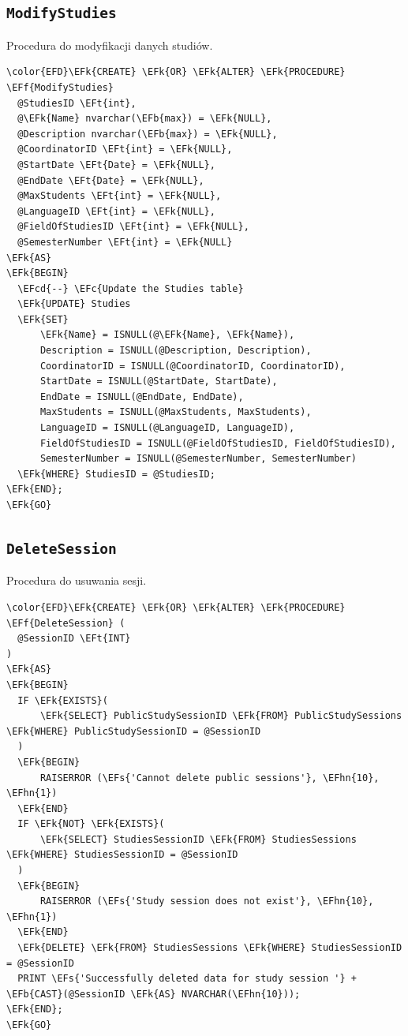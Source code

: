 \documentclass[11pt]{article}
\newcommand{\EFc}[1]{\textcolor{EFc}{\textit{#1}}} %
\newcommand{\EFcd}[1]{\textcolor{EFcd}{\textit{#1}}} %
\newcommand{\EFs}[1]{\textcolor{EFs}{#1}} %
\newcommand{\EFk}[1]{\textcolor{EFk}{\textbf{#1}}} %
\newcommand{\EFb}[1]{\textcolor{EFb}{\textbf{#1}}} %
\newcommand{\EFf}[1]{\textcolor{EFf}{#1}} %
\newcommand{\EFt}[1]{\textcolor{EFt}{\textbf{#1}}} %
\newcommand{\EFhn}[1]{\textcolor{EFhn}{#1}} %
\begin{document}
\subsection{\texttt{ModifyStudies}}
\label{sec:org184f578}
Procedura do modyfikacji danych studiów.
\begin{Code}
\begin{Verbatim}
\color{EFD}\EFk{CREATE} \EFk{OR} \EFk{ALTER} \EFk{PROCEDURE} \EFf{ModifyStudies}
  @StudiesID \EFt{int},
  @\EFk{Name} nvarchar(\EFb{max}) = \EFk{NULL},
  @Description nvarchar(\EFb{max}) = \EFk{NULL},
  @CoordinatorID \EFt{int} = \EFk{NULL},
  @StartDate \EFt{Date} = \EFk{NULL},
  @EndDate \EFt{Date} = \EFk{NULL},
  @MaxStudents \EFt{int} = \EFk{NULL},
  @LanguageID \EFt{int} = \EFk{NULL},
  @FieldOfStudiesID \EFt{int} = \EFk{NULL},
  @SemesterNumber \EFt{int} = \EFk{NULL}
\EFk{AS}
\EFk{BEGIN}
  \EFcd{--} \EFc{Update the Studies table}
  \EFk{UPDATE} Studies
  \EFk{SET}
      \EFk{Name} = ISNULL(@\EFk{Name}, \EFk{Name}),
      Description = ISNULL(@Description, Description),
      CoordinatorID = ISNULL(@CoordinatorID, CoordinatorID),
      StartDate = ISNULL(@StartDate, StartDate),
      EndDate = ISNULL(@EndDate, EndDate),
      MaxStudents = ISNULL(@MaxStudents, MaxStudents),
      LanguageID = ISNULL(@LanguageID, LanguageID),
      FieldOfStudiesID = ISNULL(@FieldOfStudiesID, FieldOfStudiesID),
      SemesterNumber = ISNULL(@SemesterNumber, SemesterNumber)
  \EFk{WHERE} StudiesID = @StudiesID;
\EFk{END};
\EFk{GO}
\end{Verbatim}
\end{Code}
\subsection{\texttt{DeleteSession}}
\label{sec:org30e3a87}
Procedura do usuwania sesji.
\begin{Code}
\begin{Verbatim}
\color{EFD}\EFk{CREATE} \EFk{OR} \EFk{ALTER} \EFk{PROCEDURE} \EFf{DeleteSession} (
  @SessionID \EFt{INT}
)
\EFk{AS}
\EFk{BEGIN}
  IF \EFk{EXISTS}(
      \EFk{SELECT} PublicStudySessionID \EFk{FROM} PublicStudySessions \EFk{WHERE} PublicStudySessionID = @SessionID
  )
  \EFk{BEGIN}
      RAISERROR (\EFs{'Cannot delete public sessions'}, \EFhn{10}, \EFhn{1})
  \EFk{END}
  IF \EFk{NOT} \EFk{EXISTS}(
      \EFk{SELECT} StudiesSessionID \EFk{FROM} StudiesSessions \EFk{WHERE} StudiesSessionID = @SessionID
  )
  \EFk{BEGIN}
      RAISERROR (\EFs{'Study session does not exist'}, \EFhn{10}, \EFhn{1})
  \EFk{END}
  \EFk{DELETE} \EFk{FROM} StudiesSessions \EFk{WHERE} StudiesSessionID = @SessionID
  PRINT \EFs{'Successfully deleted data for study session '} + \EFb{CAST}(@SessionID \EFk{AS} NVARCHAR(\EFhn{10}));
\EFk{END};
\EFk{GO}
\end{Verbatim}
\end{Code}
\end{document}
